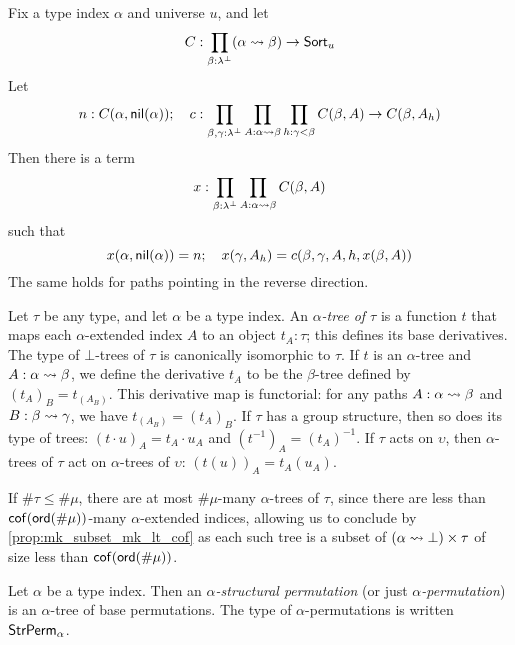 \begin{proposition}
  \label{prop:Path.rec}
  Fix a type index \( \alpha \) and universe \( u \), and let
  \[ C : \prod_{\beta : \lambda^\bot} (\alpha \rightsquigarrow \beta) \to \mathsf{Sort}_u \]
  Let
  \[ n : C(\alpha, \operatorname{\mathsf{nil}}(\alpha));\quad c : \prod_{\beta, \gamma : \lambda^\bot} \prod_{A : \alpha \rightsquigarrow \beta} \prod_{h : \gamma < \beta} C(\beta, A) \to C(\beta, A_h) \]
  Then there is a term
  \[ x : \prod_{\beta : \lambda^\bot} \prod_{A : \alpha \rightsquigarrow \beta} C(\beta, A) \]
  such that
  \[ x(\alpha, \operatorname{\mathsf{nil}}(\alpha)) = n;\quad x(\gamma, A_h) = c(\beta, \gamma, A, h, x(\beta, A)) \]
  The same holds for paths pointing in the reverse direction.
\end{proposition}
\begin{definition}[tree]
  \label{def:Tree}
  Let \( \tau \) be any type, and let \( \alpha \) be a type index.
  An \emph{\( \alpha \)-tree of \( \tau \)} is a function \( t \) that maps each \( \alpha \)-extended index \( A \) to an object \( t_A : \tau \); this defines its base derivatives.
  The type of \( \bot \)-trees of \( \tau \) is canonically isomorphic to \( \tau \).
  If \( t \) is an \( \alpha \)-tree and \( A : \alpha \rightsquigarrow \beta \), we define the derivative \( t_A \) to be the \( \beta \)-tree defined by \( (t_A)_B = t_{(A_B)} \).
  This derivative map is functorial: for any paths \( A : \alpha \rightsquigarrow \beta \) and \( B : \beta \rightsquigarrow \gamma \), we have \( t_{(A_B)} = (t_A)_B \).
  If \( \tau \) has a group structure, then so does its type of trees: \( (t \cdot u)_A = t_A \cdot u_A \) and \( (t^{-1})_A = (t_A)^{-1} \).
  If \( \tau \) acts on \( \upsilon \), then \( \alpha \)-trees of \( \tau \) act on \( \alpha \)-trees of \( \upsilon \): \( (t(u))_A = t_A(u_A) \).

  If \( \#\tau \leq \#\mu \), there are at most \( \#\mu \)-many \( \alpha \)-trees of \( \tau \), since there are less than \( \operatorname{\mathsf{cof}}(\operatorname{\mathsf{ord}}(\#\mu)) \)-many \( \alpha \)-extended indices, allowing us to conclude by \cref{prop:mk_subset_mk_lt_cof} as each such tree is a subset of \( (\alpha \rightsquigarrow \bot) \times \tau \) of size less than \( \operatorname{\mathsf{cof}}(\operatorname{\mathsf{ord}}(\#\mu)) \).
\end{definition}
\begin{definition}
  \label{def:StrPerm}
  Let \( \alpha \) be a type index.
  Then an \emph{\( \alpha \)-structural permutation} (or just \emph{\( \alpha \)-permutation}) is an \( \alpha \)-tree of base permutations.
  The type of \( \alpha \)-permutations is written \( \mathsf{StrPerm}_\alpha \).
\end{definition}

